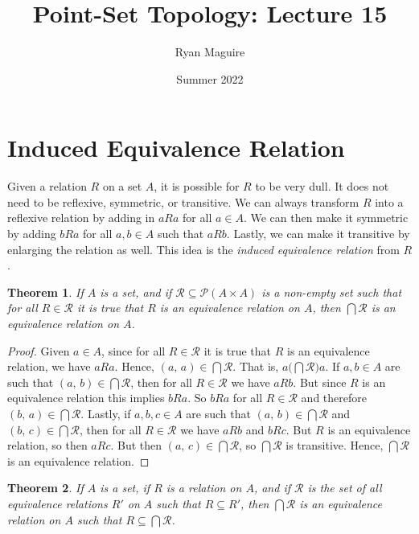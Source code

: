 \documentclass{article}
\title{Point-Set Topology: Lecture 15}
\author{Ryan Maguire}
\date{Summer 2022}
\theoremstyle{plain}
\newtheorem{theorem}{Theorem}[section]
\theoremstyle{normal}
\begin{document}
    \maketitle
    \section{Induced Equivalence Relation}
        Given a relation $R$ on a set $A$, it is possible for $R$ to be very
        dull. It does not need to be reflexive, symmetric, or transitive. We
        can always transform $R$ into a reflexive relation by adding in
        $aRa$ for all $a\in{A}$. We can then make it symmetric by adding
        $bRa$ for all $a,b\in{A}$ such that $aRb$. Lastly, we can make it
        transitive by enlarging the relation as well. This idea is the
        \textit{induced equivalence relation} from $R$.
        \begin{theorem}
            If $A$ is a set, and if
            $\mathcal{R}\subseteq\mathcal{P}(A\times{A})$ is a non-empty set
            such that for all $R\in\mathcal{R}$ it is true that $R$ is an
            equivalence relation on $A$, then $\bigcap\mathcal{R}$ is an
            equivalence relation on $A$.
        \end{theorem}
        \begin{proof}
            Given $a\in{A}$, since for all $R\in\mathcal{R}$ it is true that
            $R$ is an equivalence relation, we have $aRa$.
            Hence, $(a,\,a)\in\bigcap\mathcal{R}$. That is,
            $a\big(\bigcap\mathcal{R}\big)a$. If $a,b\in{A}$ are such that
            $(a,\,b)\in\bigcap\mathcal{R}$, then for all $R\in\mathcal{R}$ we
            have $aRb$. But since $R$ is an equivalence relation this implies
            $bRa$. So $bRa$ for all $R\in\mathcal{R}$ and therefore
            $(b,\,a)\in\bigcap\mathcal{R}$. Lastly, if $a,b,c\in{A}$ are such
            that $(a,\,b)\in\bigcap\mathcal{R}$ and
            $(b,\,c)\in\bigcap\mathcal{R}$, then for all $R\in\mathcal{R}$ we
            have $aRb$ and $bRc$. But $R$ is an equivalence relation, so then
            $aRc$. But then $(a,\,c)\in\bigcap\mathcal{R}$, so
            $\bigcap\mathcal{R}$ is transitive. Hence, $\bigcap\mathcal{R}$ is
            an equivalence relation.
        \end{proof}
        \begin{theorem}
            If $A$ is a set, if $R$ is a relation on $A$, and if
            $\mathcal{R}$ is the set of all equivalence relations
            $R'$ on $A$ such that $R\subseteq{R}'$, then
            $\bigcap\mathcal{R}$ is an equivalence relation on $A$ such that
            $R\subseteq\bigcap\mathcal{R}$.
        \end{theorem}
\end{document}

